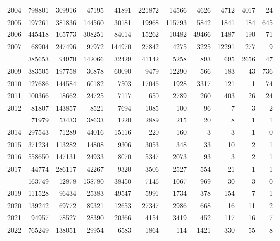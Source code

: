 \documentclass[
]{article}
\begin{document}
\begin{longtable}[t]{lrrrrrrrrrr}
2004 & 798801 & 309916 & 47195 & 41891 & 221872 & 14566 & 4626 & 4712 & 4017 & 24\\
2005 & 197261 & 381836 & 144560 & 30181 & 19968 & 115793 & 5842 & 1841 & 184 & 645\\
2006 & 445418 & 105773 & 308251 & 84014 & 15262 & 10482 & 49466 & 1487 & 190 & 71\\
2007 & 68904 & 247496 & 97972 & 144970 & 27842 & 4275 & 3225 & 12291 & 277 & 9\\
\addlinespace
2008 & 385653 & 94970 & 142066 & 32429 & 41142 & 5258 & 893 & 695 & 2656 & 47\\
2009 & 383505 & 197758 & 30878 & 60090 & 9479 & 12290 & 566 & 183 & 43 & 736\\
2010 & 127686 & 144584 & 60182 & 7503 & 17046 & 1928 & 3317 & 121 & 1 & 74\\
2011 & 100366 & 18662 & 24725 & 7117 & 650 & 2789 & 260 & 403 & 26 & 24\\
2012 & 81807 & 143857 & 8521 & 7694 & 1085 & 100 & 96 & 7 & 3 & 2\\
\addlinespace
2013 & 71979 & 53433 & 38633 & 1220 & 2889 & 215 & 20 & 8 & 1 & 1\\
2014 & 297543 & 71289 & 44016 & 15116 & 220 & 160 & 3 & 3 & 1 & 0\\
2015 & 371234 & 113282 & 14808 & 9306 & 3053 & 348 & 33 & 10 & 2 & 1\\
2016 & 558650 & 147131 & 24933 & 8070 & 5347 & 2073 & 93 & 3 & 2 & 1\\
2017 & 44774 & 286117 & 42267 & 9320 & 3506 & 2527 & 554 & 21 & 1 & 1\\
\addlinespace
2018 & 163749 & 12878 & 158780 & 38450 & 7146 & 1067 & 969 & 30 & 3 & 0\\
2019 & 111528 & 96434 & 25383 & 49547 & 5991 & 1734 & 378 & 154 & 7 & 1\\
2020 & 139242 & 69772 & 89321 & 12653 & 27347 & 2986 & 668 & 16 & 11 & 2\\
2021 & 94957 & 78527 & 28390 & 20366 & 4154 & 3419 & 452 & 117 & 16 & 7\\
2022 & 765249 & 138051 & 29954 & 6583 & 1864 & 114 & 1421 & 330 & 55 & 8\\*
\end{longtable}
\end{document}
